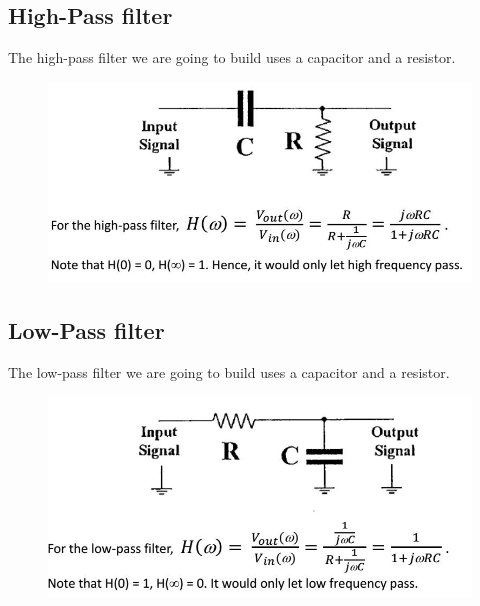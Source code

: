 \documentclass{article}
\begin{document}
\subsection{High-Pass filter}
The high-pass filter we are going to build uses a capacitor and a resistor.
  \begin{figure}[H]
  \centering
  \includegraphics[width=.7\textwidth]{Figure3.jpg}
  \label{img} 
\end{figure}
\subsection{Low-Pass filter}
The low-pass filter we are going to build uses a capacitor and a resistor.
  \begin{figure}[H]
  \centering
  \includegraphics[width=.7\textwidth]{Figure4.jpg}
  \label{img} 
\end{figure}
\end{document}
